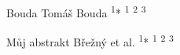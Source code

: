 

\abstract
{Bouda Tomáš} 
{Bouda} 
{\textsuperscript{1}*} 
{\POtag} 
{
	\textsuperscript{1}
	\textsuperscript{2}
	\textsuperscript{3}
}
{}  %
{}
{
}
{
}


\abstract
{Můj abstrakt} 
{Břežný et al.} 
{\textsuperscript{1}*} 
{\KLtag} 
{
	\textsuperscript{1}
	\textsuperscript{2}
	\textsuperscript{3}
}
{}  %
{}
{
}
{
}


